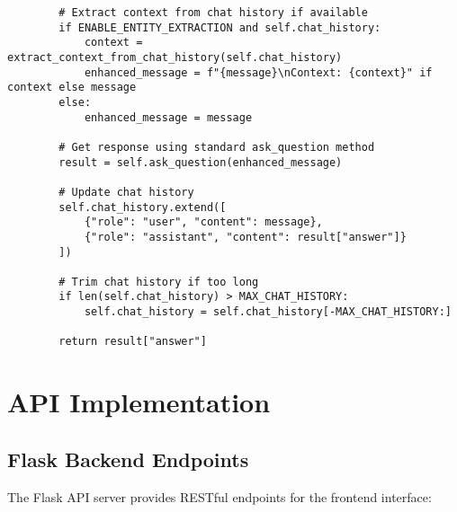 \begin{verbatim}
        # Extract context from chat history if available
        if ENABLE_ENTITY_EXTRACTION and self.chat_history:
            context = extract_context_from_chat_history(self.chat_history)
            enhanced_message = f"{message}\nContext: {context}" if context else message
        else:
            enhanced_message = message
        
        # Get response using standard ask_question method
        result = self.ask_question(enhanced_message)
        
        # Update chat history
        self.chat_history.extend([
            {"role": "user", "content": message},
            {"role": "assistant", "content": result["answer"]}
        ])
        
        # Trim chat history if too long
        if len(self.chat_history) > MAX_CHAT_HISTORY:
            self.chat_history = self.chat_history[-MAX_CHAT_HISTORY:]
        
        return result["answer"]
\end{verbatim}

\section{API Implementation}

\subsection{Flask Backend Endpoints}

The Flask API server provides RESTful endpoints for the frontend interface:

